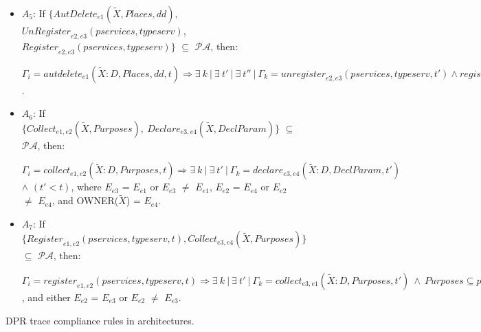 \documentclass[a4paper]{article}
\begin{document}
\begin{figure}[htbp]
{\begin{minipage}{13.87 cm}
\begin{itemize}
$\Gamma_i =  \textit{mandelete}_{e1}(\tilde{X}:D, \textit{Places}, \textit{dd}, t) 
 \Longrightarrow
\exists \ k \  | \ \exists \ t' \ | \exists\ \textit{DEL} = \{\textit{deletereq}_{e_i, e_j}(\tilde{X} : D, t_n)\} \ |\ \Gamma_k =  \textit{deletereq}_{e2, e1}(\tilde{X} : D, t')$ $\wedge$  (\textit{deletereq}$_{e2, e1}(\tilde{X} : D, t')$ $\in$ \textit{DEL}) $\wedge$ ($t'$ < $t$) $\wedge$  ($t$ - $t'$ $\leq$ $dd$).\\ 

\item $A_5$: If $\{$$\textit{AutDelete}_{e1}(\tilde{X}, \textit{Places}, dd)$, $\textit{UnRegister}_{e2,e3}(\textit{pservices}, \textit{typeserv})$, $\textit{Register}_{e2,e3}(\textit{pservices}, \textit{typeserv})$$\}$ $\subseteq$ $\mathcal{P}\mathcal{A}$, then:

$\Gamma_i =  \textit{autdelete}_{e1}(\tilde{X}:D, \textit{Places}, \textit{dd}, t)
 \Longrightarrow
\exists \ k \ | \ \exists \ t'\ | \ \exists \ t''  \ | \ \Gamma_k =  \textit{unregister}_{e2,e3}(\textit{pservices}, \textit{typeserv}, t') \wedge \textit{register}_{e2,e3}(\textit{pservices}, \textit{typeserv}, t'')\  \wedge\ (t'' < t' < t)\ \wedge\ (t-t' < dd)$.\\ 

\item $A_6$: If $\{\textit{Collect}_{e1, e2}(\tilde{X}, \textit{Purposes}),\ \textit{Declare}_{e3, e4}(\tilde{X}, \textit{DeclParam})\}$ $\subseteq$ $\mathcal{P}\mathcal{A}$, then: 

$\Gamma_i = \textit{collect}_{e1, e2}(\tilde{X}:D, \textit{Purposes}, t) \Longrightarrow
\exists \ k \ | \ \exists \ t' \ | \ \Gamma_k =  \textit{declare}_{e3, e4}(\tilde{X}:D, \textit{DeclParam}, t')$ $\wedge$ $(t' < t)$, where $E_{e3}$ = $E_{e1}$ or $E_{e3}$ $\neq$ $E_{e1}$, $E_{e2}$ = $E_{e4}$ or $E_{e2}$ $\neq$ $E_{e4}$, and OWNER($\tilde{X}$) = $E_{e4}$.\\  

\item $A_7$: If $\{\textit{Register}_{e1,e2}(\textit{pservices}, \textit{typeserv}, t), \textit{Collect}_{e3, e4}(\tilde{X}, \textit{Purposes})\}$ $\subseteq$ $\mathcal{P}\mathcal{A}$, then: 

$\Gamma_i =  \textit{register}_{e1,e2}(\textit{pservices}, \textit{typeserv}, t)
 \Longrightarrow
\exists \ k \ | \ \exists \ t' \ | \ \Gamma_k =  \textit{collect}_{e3, e1}(\tilde{X}:D, \textit{Purposes}, t')\ \wedge\ \textit{Purposes} \subseteq \textit{pservices}\ \wedge\ \textit{TYPE}(\tilde{X})\ \in\ \textit{typeserv}\ \wedge\ (t' < t)$, and either $E_{e2}$ = $E_{e3}$ or $E_{e2}$ $\neq$ $E_{e3}$.\\ 

\end{itemize}

\end{minipage}
}
\caption{DPR trace compliance rules in architectures.}\label{fig:comparch0}
\end{figure}
  
\end{document}
